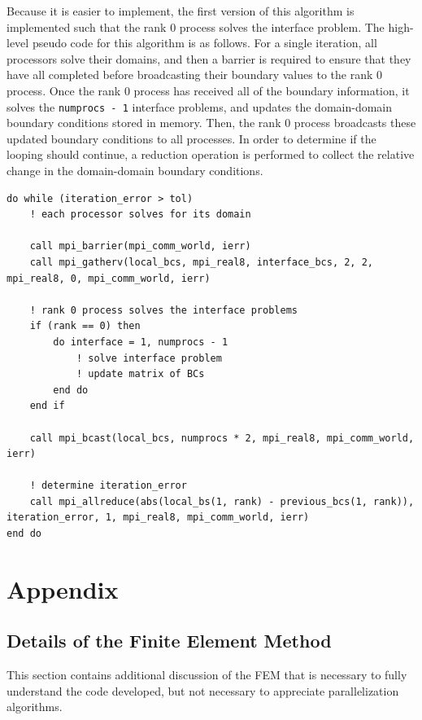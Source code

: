 \documentclass[10pt]{article}
\begin{document}
Because it is easier to implement, the first version of this algorithm is implemented such that the rank 0 process solves the interface problem. The high-level pseudo code for this algorithm is as follows. For a single iteration, all processors solve their domains, and then a barrier is required to ensure that they have all completed before broadcasting their boundary values to the rank 0 process. Once the rank 0 process has received all of the boundary information, it solves the {\tt numprocs - 1} interface problems, and updates the domain-domain boundary conditions stored in memory. Then, the rank 0 process broadcasts these updated boundary conditions to all processes. In order to determine if the looping should continue, a reduction operation is performed to collect the relative change in the domain-domain boundary conditions.

\begin{lstlisting}
do while (iteration_error > tol)
	! each processor solves for its domain

	call mpi_barrier(mpi_comm_world, ierr)
	call mpi_gatherv(local_bcs, mpi_real8, interface_bcs, 2, 2, mpi_real8, 0, mpi_comm_world, ierr)
	
	! rank 0 process solves the interface problems
	if (rank == 0) then
		do interface = 1, numprocs - 1
			! solve interface problem
			! update matrix of BCs
		end do
	end if
	
	call mpi_bcast(local_bcs, numprocs * 2, mpi_real8, mpi_comm_world, ierr)
	
	! determine iteration_error
	call mpi_allreduce(abs(local_bs(1, rank) - previous_bcs(1, rank)), iteration_error, 1, mpi_real8, mpi_comm_world, ierr)
end do
\end{lstlisting}


\section{Appendix}
\subsection{Details of the Finite Element Method}
This section contains additional discussion of the FEM that is necessary to fully understand the code developed, but not necessary to appreciate parallelization algorithms.
\end{document}
